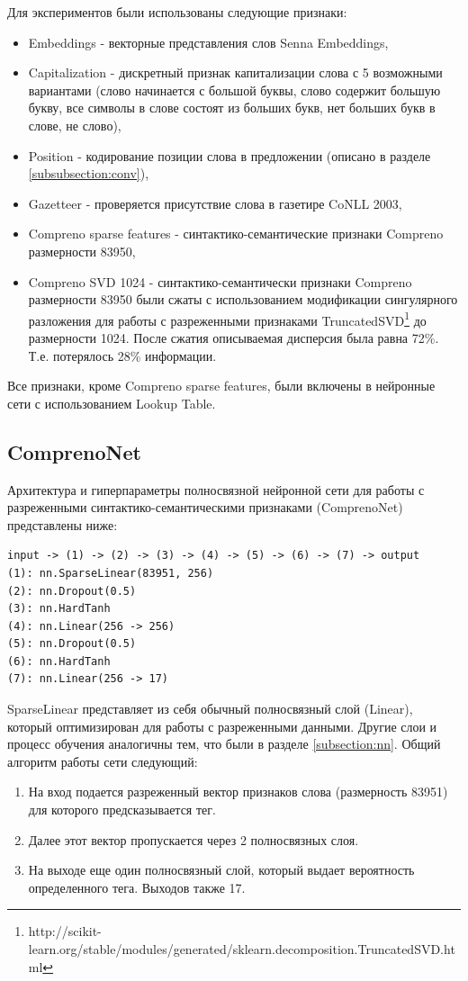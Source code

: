 Для экспериментов были использованы следующие признаки:
\begin{itemize}
\item Embeddings - векторные представления слов Senna Embeddings,
\item Capitalization - дискретный признак капитализации слова с 5 возможными вариантами
(слово начинается с большой буквы, слово содержит большую букву,
все символы в слове состоят из больших букв, нет больших букв в слове, не слово),
\item Position - кодирование позиции слова в предложении (описано в разделе \ref{subsubsection:conv}),
\item Gazetteer - проверяется присутствие слова в газетире CoNLL 2003,
\item Compreno sparse features - синтактико-се\-ман\-ти\-ческие признаки Compreno размерности 83950,
\item Compreno SVD 1024 - синтактико-семантически признаки Compreno размерности 83950 были сжаты с использованием
модификации сингулярного разложения для работы с разреженными признаками
TruncatedSVD\footnote{http://scikit-learn.org/stable/modules/generated/sklearn.decomposition.TruncatedSVD.html}
до размерности 1024. После сжатия описываемая дисперсия была равна 72\%. Т.е. потерялось 28\% информации.
\end{itemize}

Все признаки, кроме Compreno sparse features, были включены в нейронные сети с использованием Lookup Table.


\subsection{ComprenoNet}

Архитектура и гиперпараметры полносвязной нейронной сети для работы с разреженными
синтактико-семантическими признаками (ComprenoNet) представлены ниже:
\begin{lstlisting}
input -> (1) -> (2) -> (3) -> (4) -> (5) -> (6) -> (7) -> output
(1): nn.SparseLinear(83951, 256)
(2): nn.Dropout(0.5)
(3): nn.HardTanh
(4): nn.Linear(256 -> 256)
(5): nn.Dropout(0.5)
(6): nn.HardTanh
(7): nn.Linear(256 -> 17)
\end{lstlisting}

SparseLinear представляет из себя обычный полносвязный слой (Linear), который
оптимизирован для работы с разреженными данными. Другие слои и процесс обучения
аналогичны тем, что были в разделе \ref{subsection:nn}.
Общий алгоритм работы сети следующий:
\begin{enumerate}
  \item На вход подается разреженный вектор признаков слова (размерность 83951) для которого предсказывается тег.
  \item Далее этот вектор пропускается через 2 полносвязных слоя.
  \item На выходе еще один полносвязный слой, который выдает вероятность определенного тега.
  Выходов также 17.
\end{enumerate}

